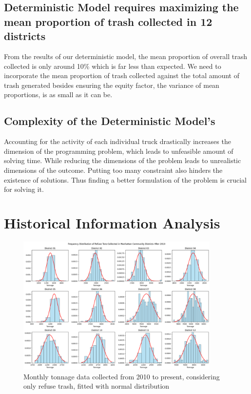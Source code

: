 \documentclass{article}
\begin{document}
\subsection{Deterministic Model requires maximizing the mean proportion of trash collected in 12 districts}

From the results of our deterministic model, the mean proportion of overall trash collected is only around 10\% which is far less than expected. We need to incorporate the mean proportion of trash collected against the total amount of trash generated besides ensuring the equity factor, the variance of mean proportions, is as small as it can be.

\subsection{Complexity of the Deterministic Model's}

Accounting for the activity of each individual truck drastically increases the dimension of the programming problem, which leads to unfeasible amount of solving time. While reducing the dimensions of the problem leads to unrealistic dimensions of the outcome. Putting too many constraint also hinders the existence of solutions. Thus finding a better formulation of the problem is crucial for solving it.


\newpage
\appendix
\section{Historical Information Analysis}
\label{sec:hia}

\begin{figure}[H]
    \centering
    \includegraphics[width=0.9\textwidth]{figures/tonal.png}
	\caption{Monthly tonnage data collected from 2010 to present, considering only refuse trash, fitted with normal distribution }
    \label{fig:tonal}
\end{figure}
\end{document}
